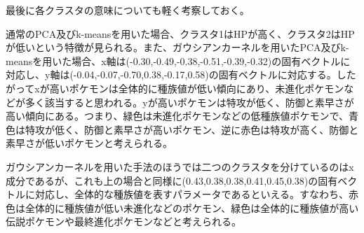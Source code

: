 \documentclass[a4paper,11pt]{jsarticle}
\begin{document}
最後に各クラスタの意味についても軽く考察しておく。

通常のPCA及びk-meansを用いた場合、クラスタ1はHPが高く、クラスタ2はHPが低いという特徴が見られる。また、ガウシアンカーネルを用いたPCA及びk-meansを用いた場合、x軸は(-0.30,-0.49,-0.38,-0.51,-0.39,-0.32)の固有ベクトルに対応し、y軸は(-0.04,-0.07,-0.70,0.38,-0.17,0.58)の固有ベクトルに対応する。したがってxが高いポケモンは全体的に種族値が低い傾向にあり、未進化ポケモンなどが多く該当すると思われる。yが高いポケモンは特攻が低く、防御と素早さが高い傾向にある。つまり、緑色は未進化ポケモンなどの低種族値ポケモンで、青色は特攻が低く、防御と素早さが高いポケモン、逆に赤色は特攻が高く、防御と素早さが低いポケモンと考えられる。

ガウシアンカーネルを用いた手法のほうでは二つのクラスタを分けているのはx成分であるが、これも上の場合と同様に(0.43,0.38,0.38,0.41,0.45,0.38)の固有ベクトルに対応し、全体的な種族値を表すパラメータであるといえる。すなわち、赤色は全体的に種族値が低い未進化などのポケモン、緑色は全体的に種族値が高い伝説ポケモンや最終進化ポケモンなどと考えられる。
\end{document}
